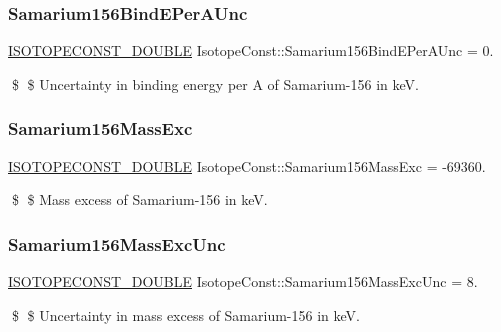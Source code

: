 \subsubsection{\texorpdfstring{Samarium156\+Bind\+E\+Per\+A\+Unc}{Samarium156BindEPerAUnc}}
{\footnotesize\ttfamily \mbox{\hyperlink{group___isotope_const-_macros_ga8f45a7272ce02c0b4c65c44636ed719a}{I\+S\+O\+T\+O\+P\+E\+C\+O\+N\+S\+T\+\_\+\+D\+O\+U\+B\+LE}} Isotope\+Const\+::\+Samarium156\+Bind\+E\+Per\+A\+Unc = 0.}

\$ \$ Uncertainty in binding energy per A of Samarium-\/156 in keV. \mbox{\label{group___isotope_const-_samarium-_sm156_ga4c71489ee6113dc670b3194f30a0ce06}} 
\subsubsection{\texorpdfstring{Samarium156\+Mass\+Exc}{Samarium156MassExc}}
{\footnotesize\ttfamily \mbox{\hyperlink{group___isotope_const-_macros_ga8f45a7272ce02c0b4c65c44636ed719a}{I\+S\+O\+T\+O\+P\+E\+C\+O\+N\+S\+T\+\_\+\+D\+O\+U\+B\+LE}} Isotope\+Const\+::\+Samarium156\+Mass\+Exc = -\/69360.}

\$ \$ Mass excess of Samarium-\/156 in keV. \mbox{\label{group___isotope_const-_samarium-_sm156_ga57d8135caf6af25b44ca949405c6848d}} 
\subsubsection{\texorpdfstring{Samarium156\+Mass\+Exc\+Unc}{Samarium156MassExcUnc}}
{\footnotesize\ttfamily \mbox{\hyperlink{group___isotope_const-_macros_ga8f45a7272ce02c0b4c65c44636ed719a}{I\+S\+O\+T\+O\+P\+E\+C\+O\+N\+S\+T\+\_\+\+D\+O\+U\+B\+LE}} Isotope\+Const\+::\+Samarium156\+Mass\+Exc\+Unc = 8.}

\$ \$ Uncertainty in mass excess of Samarium-\/156 in keV. \mbox{\label{group___isotope_const-_samarium-_sm156_ga506c8afc74a14755adeb52feae1e5532}} 
